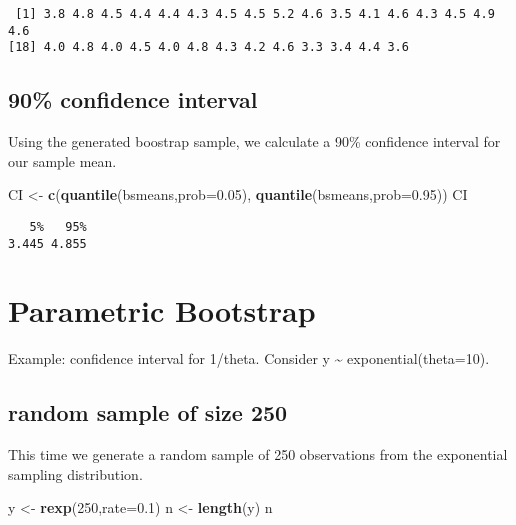 \documentclass[]{book}
\newenvironment{Shaded}{\begin{snugshade}}{\end{snugshade}}
\newcommand{\KeywordTok}[1]{\textcolor[rgb]{0.13,0.29,0.53}{\textbf{#1}}}
\newcommand{\DataTypeTok}[1]{\textcolor[rgb]{0.13,0.29,0.53}{#1}}
\newcommand{\DecValTok}[1]{\textcolor[rgb]{0.00,0.00,0.81}{#1}}
\newcommand{\FloatTok}[1]{\textcolor[rgb]{0.00,0.00,0.81}{#1}}
\newcommand{\StringTok}[1]{\textcolor[rgb]{0.31,0.60,0.02}{#1}}
\newcommand{\NormalTok}[1]{#1}
\theoremstyle{definition}
\theoremstyle{definition}
\theoremstyle{definition}
\theoremstyle{remark}
\begin{document}
\begin{verbatim}
 [1] 3.8 4.8 4.5 4.4 4.4 4.3 4.5 4.5 5.2 4.6 3.5 4.1 4.6 4.3 4.5 4.9 4.6
[18] 4.0 4.8 4.0 4.5 4.0 4.8 4.3 4.2 4.6 3.3 3.4 4.4 3.6
\end{verbatim}

\subsection{90\% confidence interval}\label{confidence-interval}

Using the generated boostrap sample, we calculate a 90\% confidence
interval for our sample mean.

\begin{Shaded}
\begin{Highlighting}[]
\NormalTok{CI <-}\StringTok{ }\KeywordTok{c}\NormalTok{(}\KeywordTok{quantile}\NormalTok{(bsmeans,}\DataTypeTok{prob=}\FloatTok{0.05}\NormalTok{), }\KeywordTok{quantile}\NormalTok{(bsmeans,}\DataTypeTok{prob=}\FloatTok{0.95}\NormalTok{))}
\NormalTok{CI}
\end{Highlighting}
\end{Shaded}

\begin{verbatim}
   5%   95% 
3.445 4.855 
\end{verbatim}

\section{Parametric Bootstrap}\label{parametric-bootstrap}

Example: confidence interval for 1/theta. Consider y \textasciitilde{}
exponential(theta=10).

\subsection{random sample of size 250}\label{random-sample-of-size-250}

This time we generate a random sample of 250 observations from the
exponential sampling distribution.

\begin{Shaded}
\begin{Highlighting}[]
\NormalTok{y <-}\StringTok{ }\KeywordTok{rexp}\NormalTok{(}\DecValTok{250}\NormalTok{,}\DataTypeTok{rate=}\FloatTok{0.1}\NormalTok{)}
\NormalTok{n <-}\StringTok{ }\KeywordTok{length}\NormalTok{(y)}
\NormalTok{n}
\end{Highlighting}
\end{Shaded}
\end{document}
